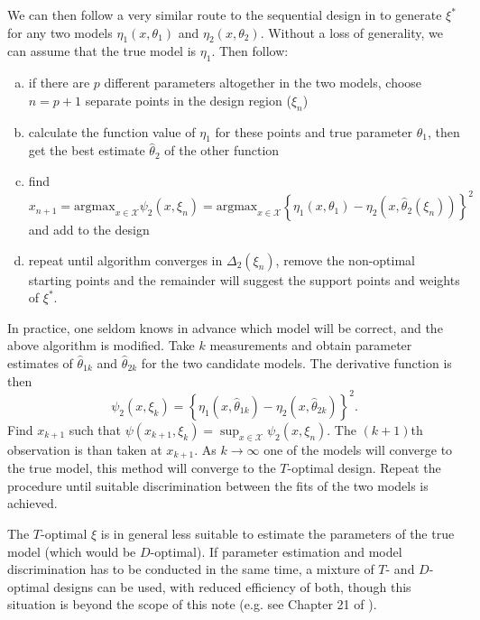 \documentclass[12pt]{iopart}
\begin{document}
We can then follow a very similar route to the sequential design in  to generate $\xi^*$ for any two models $\eta_1(x, \theta_1)$ and $\eta_2(x, \theta_2)$. Without a loss of generality, we can assume that the true model is $\eta_1$. Then follow:
\begin{enumerate}[(a)]
\item if there are $p$ different parameters altogether in the two models, choose $n = p+1$ separate points in the design region ($\xi_n$)
\item calculate the function value of $\eta_1$ for these points and true parameter $\theta_1$, then get the best estimate $\hat \theta_2$ of the other function
\item find $x_{n+1} = \mathrm{argmax}_{x \in \mathcal{X}}\psi_2(x, \xi_n) = \mathrm{argmax}_{x \in \mathcal{X}} \left\{\eta_1(x, \theta_1) - \eta_2(x, \hat \theta_2(\xi_n))\right\}^2$ and add to the design
\item repeat until algorithm converges in $\Delta_2(\xi_n)$, remove the non-optimal starting points and the remainder will suggest the support points and weights of $\xi^*$.
\end{enumerate}

In practice, one seldom knows in advance which model will be correct, and the above algorithm is modified. Take $k$ measurements and obtain parameter estimates of $\hat \theta_{1k}$ and $\hat \theta_{2k}$ for the two candidate models. The derivative function is then 
\begin{equation}
\psi_2(x, \xi_k) = \left\{\eta_1(x, \hat \theta_{1k}) - \eta_2(x, \hat \theta_{2k})\right\}^2.
\end{equation}
Find $x_{k+1}$ such that $\psi(x_{k+1}, \xi_k) = \sup_{x \in \mathcal{X}}\psi_2(x, \xi_n)$. The $(k+1)$th observation is than taken at $x_{k+1}$. As $k \rightarrow \infty$ one of the models will converge to the true model, this method will converge to the $T$-optimal design. Repeat the procedure until suitable discrimination between the fits of the two models is achieved.

The $T$-optimal $\xi$ is in general less suitable to estimate the parameters of the true model (which would be $D$-optimal). If parameter estimation and model discrimination has to be conducted in the same time, a mixture of $T$- and $D$-optimal designs can be used, with reduced efficiency of both, though this situation is beyond the scope of this note (e.g. see Chapter 21 of \cite{Emery1998}).

\end{document}
